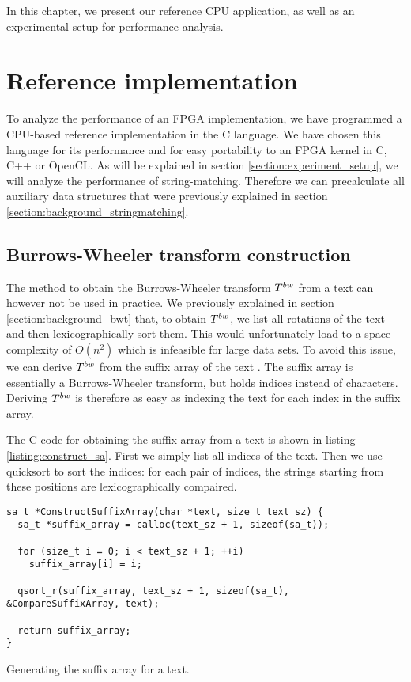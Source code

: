 In this chapter, we present our reference CPU application, as well as an experimental setup for performance analysis.

\section{Reference implementation} \label{section:ref_impl}

To analyze the performance of an FPGA implementation, we have programmed a CPU-based reference implementation in the C language.
We have chosen this language for its performance and for easy portability to an FPGA kernel in C, C++ or OpenCL.
As will be explained in section \ref{section:experiment_setup}, we will analyze the performance of string-matching.
Therefore we can precalculate all auxiliary data structures that were previously explained in section \ref{section:background_stringmatching}.

\subsection{Burrows-Wheeler transform construction} \label{section:bwt_construction}

The method to obtain the Burrows-Wheeler transform $T^{bw}$ from a text can however not be used in practice.
We previously explained in section \ref{section:background_bwt} that, to obtain $T^{bw}$, we list all rotations of the text and then lexicographically sort them.
This would unfortunately load to a space complexity of $O(n^2)$ which is infeasible for large data sets.
To avoid this issue, we can derive $T^{bw}$ from the suffix array of the text \cite{ullah_implementation_2020}.
The suffix array is essentially a Burrows-Wheeler transform, but holds indices instead of characters.
Deriving $T^{bw}$ is therefore as easy as indexing the text for each index in the suffix array.

The C code for obtaining the suffix array from a text is shown in listing \ref{listing:construct_sa}.
First we simply list all indices of the text.
Then we use quicksort to sort the indices: for each pair of indices, the strings starting from these positions are lexicographically compaired.

\begin{listing}[ht]
\begin{verbatim}
sa_t *ConstructSuffixArray(char *text, size_t text_sz) {
  sa_t *suffix_array = calloc(text_sz + 1, sizeof(sa_t));

  for (size_t i = 0; i < text_sz + 1; ++i)
    suffix_array[i] = i;

  qsort_r(suffix_array, text_sz + 1, sizeof(sa_t), &CompareSuffixArray, text);

  return suffix_array;
}
\end{verbatim}
\caption{Generating the suffix array for a text.}
\label{listing:construct_sa}
\end{listing}

